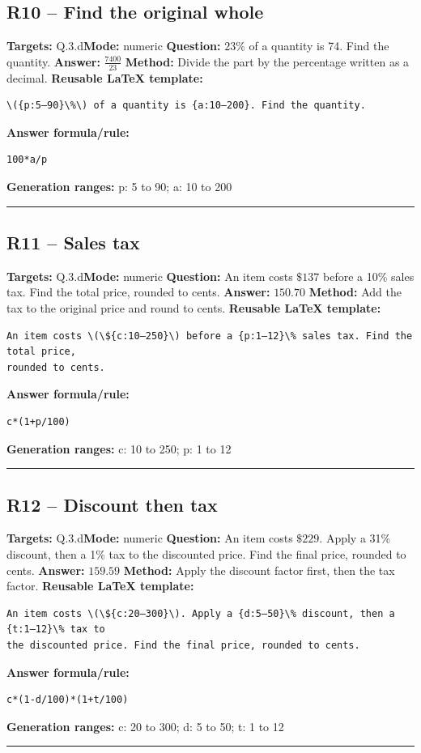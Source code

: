 \documentclass[11pt]{article}
\begin{document}
\subsection{R10 -- Find the original whole}
\textbf{Targets:} Q.3.d\quad\textbf{Mode:} numeric
\textbf{Question:} \(23\%\) of a quantity is 74. Find the quantity.
\textbf{Answer:} \(\frac{7400}{23}\)
\textbf{Method:} Divide the part by the percentage written as a decimal.
\textbf{Reusable LaTeX template:}
\begin{verbatim}
\({p:5–90}\%\) of a quantity is {a:10–200}. Find the quantity.
\end{verbatim}
\textbf{Answer formula/rule:}
\begin{verbatim}
100*a/p
\end{verbatim}
\textbf{Generation ranges:} p: 5 to 90; a: 10 to 200
\medskip\hrule\medskip
\subsection{R11 -- Sales tax}
\textbf{Targets:} Q.3.d\quad\textbf{Mode:} numeric
\textbf{Question:} An item costs \(\$137\) before a 10\% sales tax. Find the total price, rounded to cents.
\textbf{Answer:} \(150.70\)
\textbf{Method:} Add the tax to the original price and round to cents.
\textbf{Reusable LaTeX template:}
\begin{verbatim}
An item costs \(\${c:10–250}\) before a {p:1–12}\% sales tax. Find the total price,
rounded to cents.
\end{verbatim}
\textbf{Answer formula/rule:}
\begin{verbatim}
c*(1+p/100)
\end{verbatim}
\textbf{Generation ranges:} c: 10 to 250; p: 1 to 12
\medskip\hrule\medskip
\subsection{R12 -- Discount then tax}
\textbf{Targets:} Q.3.d\quad\textbf{Mode:} numeric
\textbf{Question:} An item costs \(\$229\). Apply a 31\% discount, then a 1\% tax to the discounted price. Find the final price, rounded to cents.
\textbf{Answer:} \(159.59\)
\textbf{Method:} Apply the discount factor first, then the tax factor.
\textbf{Reusable LaTeX template:}
\begin{verbatim}
An item costs \(\${c:20–300}\). Apply a {d:5–50}\% discount, then a {t:1–12}\% tax to
the discounted price. Find the final price, rounded to cents.
\end{verbatim}
\textbf{Answer formula/rule:}
\begin{verbatim}
c*(1-d/100)*(1+t/100)
\end{verbatim}
\textbf{Generation ranges:} c: 20 to 300; d: 5 to 50; t: 1 to 12
\medskip\hrule\medskip
\end{document}
